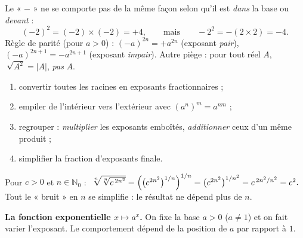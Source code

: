 \documentclass[11pt,a4paper]{article}
\newcommand{\N}{\mathbb{N}}
\begin{document}
\begin{piege}
Le « $-$ » ne se comporte pas de la même façon selon qu'il est \emph{dans} la base ou \emph{devant} :
\[ (-2)^{2}=(-2)\times(-2)=+4,\qquad\text{mais}\qquad -2^{2}=-(2\times 2)=-4. \]
Règle de parité (pour $a>0$) : $(-a)^{2n}=+a^{2n}$ (exposant \emph{pair}), $(-a)^{2n+1}=-a^{2n+1}$
(exposant \emph{impair}). Autre piège : pour tout réel $A$, $\ \sqrt{A^{2}}=|A|$, \emph{pas} $A$.
\end{piege}

\begin{methode}
\begin{enumerate}[leftmargin=1.8em,topsep=1pt,itemsep=1pt]
  \item convertir toutes les racines en exposants fractionnaires ;
  \item empiler de l'intérieur vers l'extérieur avec $(a^{n})^{m}=a^{nm}$ ;
  \item regrouper : \emph{multiplier} les exposants emboîtés, \emph{additionner} ceux d'un même produit ;
  \item simplifier la fraction d'exposants finale.
\end{enumerate}
\end{methode}

\begin{exemplebox}
Pour $c>0$ et $n\in\N_0$ : $\ \sqrt[n]{\sqrt[n]{c^{\,2n^{2}}}}
=\Bigl(\bigl(c^{2n^{2}}\bigr)^{1/n}\Bigr)^{1/n}
=\bigl(c^{2n^{2}}\bigr)^{1/n^{2}}=c^{\,2n^{2}/n^{2}}=c^{2}.$
Tout le « bruit » en $n$ se simplifie : le résultat ne dépend plus de $n$.
\end{exemplebox}

\noindent\textbf{La fonction exponentielle $x\mapsto a^{x}$.} On fixe la base $a>0$ ($a\neq1$) et on fait
varier l'exposant. Le comportement dépend de la position de $a$ par rapport à $1$.
\end{document}
